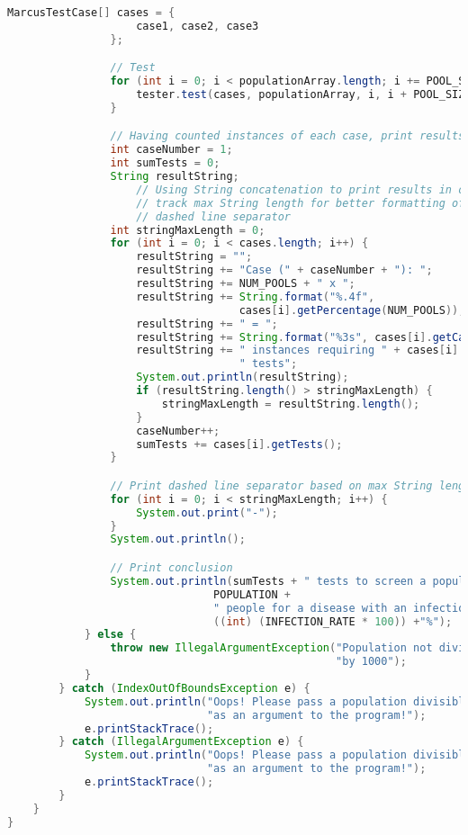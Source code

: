 \documentclass[letterpaper, 10pt]{article}
\begin{document}
\begin{lstlisting}[language=Java, firstnumber=1]
                MarcusTestCase[] cases = {
                    case1, case2, case3
                };

                // Test
                for (int i = 0; i < populationArray.length; i += POOL_SIZE) {
                    tester.test(cases, populationArray, i, i + POOL_SIZE - 1);
                }

                // Having counted instances of each case, print results
                int caseNumber = 1;
                int sumTests = 0;
                String resultString;
                    // Using String concatenation to print results in order to
                    // track max String length for better formatting of
                    // dashed line separator
                int stringMaxLength = 0;
                for (int i = 0; i < cases.length; i++) {
                    resultString = "";
                    resultString += "Case (" + caseNumber + "): ";
                    resultString += NUM_POOLS + " x ";
                    resultString += String.format("%.4f",
                                    cases[i].getPercentage(NUM_POOLS));
                    resultString += " = ";
                    resultString += String.format("%3s", cases[i].getCases());
                    resultString += " instances requiring " + cases[i].getTests() +
                                    " tests";
                    System.out.println(resultString);
                    if (resultString.length() > stringMaxLength) {
                        stringMaxLength = resultString.length();
                    }
                    caseNumber++;
                    sumTests += cases[i].getTests();
                }

                // Print dashed line separator based on max String length above
                for (int i = 0; i < stringMaxLength; i++) {
                    System.out.print("-");
                }
                System.out.println();

                // Print conclusion
                System.out.println(sumTests + " tests to screen a population of " +
                                POPULATION +
                                " people for a disease with an infection rate of " +
                                ((int) (INFECTION_RATE * 100)) +"%");
            } else {
                throw new IllegalArgumentException("Population not divisible " +
                                                   "by 1000");
            }
        } catch (IndexOutOfBoundsException e) {
            System.out.println("Oops! Please pass a population divisible by 1000 " +
                               "as an argument to the program!");
            e.printStackTrace();
        } catch (IllegalArgumentException e) {
            System.out.println("Oops! Please pass a population divisible by 1000 " +
                               "as an argument to the program!");
            e.printStackTrace();
        }   
    }
}
\end{lstlisting}
\end{document}

